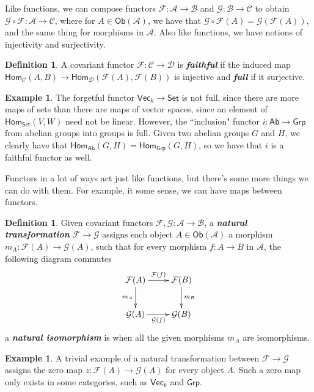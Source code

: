 \documentclass[psamsfonts]{amsart}
\theoremstyle{definition}
\newtheorem{defn}[thm]{Definition}
\newtheorem{exmp}[thm]{Example}
\theoremstyle{remark}
\renewcommand{\hom}{\mathsf{Hom}}
\newcommand{\ib}[1]{\textbf{\textit{#1}}}
\begin{document}
Like functions, we can compose functors $\mathcal{F}: \mathscr{A} \to \mathscr{B}$ and $\mathcal{G}:  \mathscr{B} \to \mathscr{C}$ to obtain $\mathcal{G} \circ \mathcal{F}: \mathscr{A} \to \mathscr{C}$, where for $A \in \mathsf{Ob}(\mathscr{A})$, we have that $\mathcal{G} \circ \mathcal{F}(A) = \mathcal{G}(\mathcal{F}(A))$, and the same thing for morphisms in $\mathscr{A}$. Also like functions, we have notions of injectivity and surjectivity.
%
\begin{defn}
A covariant functor $\mathcal{F}: \mathscr{C} \to \mathscr{D}$ is \ib{faithful} if the induced map $\hom_{\mathscr{C}}(A,B) \to \hom_{\mathscr{D}}(\mathcal{F}(A),\mathcal{F}(B))$ is injective and \ib{full} if it surjective.
\end{defn}
%
\begin{exmp}
The forgetful functor $\mathsf{Vec}_k \to \mathsf{Set}$ is not full, since there are more maps of sets than there are maps of vector spaces, since an element of $\hom_{\mathsf{Set}}(V,W)$ need not be linear. However, the ``inclusion" functor $i: \mathsf{Ab} \to \mathsf{Grp}$ from abelian groups into groups is full. Given two abelian groups $G$ and $H$, we clearly have that $\hom_{\mathsf{Ab}}(G,H) = \hom_{\mathsf{Grp}}(G,H)$, so we have that $i$ is a faithful functor as well.
\end{exmp}
Functors in a lot of ways act just like functions, but there's some more things we can do with them. For example, it some sense, we can have maps between functors.
\begin{defn}
Given covariant functors $\mathcal{F},\mathcal{G}: \mathscr{A} \to \mathscr{B}$, a \ib{natural transformation} $\mathcal{F} \to \mathcal{G}$ assigns each object $A \in \mathsf{Ob}(\mathscr{A})$ a morphism $m_A : \mathcal{F}(A) \to \mathcal{G}(A)$, such that for every morphism $f: A \to B$ in $\mathscr{A}$, the following diagram commutes
$$\xymatrix{
\mathcal{F}(A) \ar[r]^{\mathcal{F}(f)} \ar[d]_{m_A} & \mathcal{F}(B) \ar[d]^{m_B} \\
\mathcal{G}(A) \ar[r]_{\mathcal{G}(f)} & \mathcal{G}(B)
}$$
a \ib{natural isomorphism} is when all the given morphisms $m_A$ are isomorphisms.
\end{defn}
%
\begin{exmp}
A trivial example of a natural transformation between $\mathcal{F} \to \mathcal{G}$ assigns the zero map $z:\mathcal{F}(A) \to \mathcal{G}(A)$ for every object $A$. Such a zero map only exists in some categories, such as $\mathsf{Vec}_k$ and $\mathsf{Grp}$.
\end{exmp}
\end{document}
